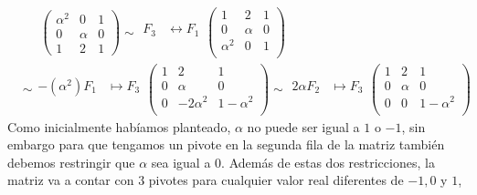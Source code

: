     \[
        \begin{aligned}
            &\phantom{\sim}
            \begin{pmatrix}
                \alpha^2 & 0 & 1 \\
                0 & \alpha & 0 \\
                1 & 2 & 1
            \end{pmatrix}
            \sim
            \begin{aligned}
                F_3 &\leftrightarrow F_1 \\
            \end{aligned}
            \begin{pmatrix}
                1 & 2 & 1 \\
                0 & \alpha & 0 \\
                \alpha^2 & 0 & 1 \\
            \end{pmatrix}
            \\
            &\sim
            \begin{aligned}
                -\left(\alpha^2\right) F_1 &\mapsto F_3 \\
            \end{aligned}
            \begin{pmatrix}
                1 & 2 & 1 \\
                0 & \alpha & 0 \\
                0 & -2\alpha^2 & 1 - \alpha^2 \\
            \end{pmatrix}
            \sim
            \begin{aligned}
                2\alpha F_2 &\mapsto F_3 \\
            \end{aligned}
            \begin{pmatrix}
                1 & 2 & 1 \\
                0 & \alpha & 0 \\
                0 & 0 & 1 - \alpha^2 \\
            \end{pmatrix}
        \end{aligned}
    \]
    Como inicialmente habíamos planteado, \(\alpha\) no puede ser igual a \(1\) o \(-1\), sin embargo para que tengamos un 
    pivote en la segunda fila de la matriz también debemos restringir que \(\alpha\) sea igual a \(0\). 
    Además de estas dos restricciones, la matriz va a contar con 3 pivotes para cualquier valor real diferentes de \(-1, 0\) y \(1\),

